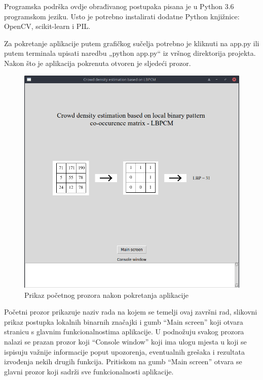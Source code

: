 \documentclass[times, utf8, zavrsni]{fer}
\begin{document}
Programska podrška ovdje obrađivanog postupaka pisana je u Python 3.6 
programskom jeziku. Usto je potrebno instalirati dodatne Python 
knjižnice: OpenCV, scikit-learn i PIL.

Za pokretanje aplikacije putem grafičkog sučelja potrebno je kliknuti 
na app.py ili putem terminala upisati naredbu „python app.py“ iz 
vršnog direktorija projekta. Nakon što je aplikacija pokrenuta 
otvoren je sljedeći prozor. 

\begin{figure}[ht]
\centering
\includegraphics[scale=0.4]{img/startpage.png}
\caption{Prikaz početnog prozora nakon pokretanja aplikacije}
\end{figure}

\newpage

Početni prozor prikazuje naziv rada na kojem se temelji ovaj završni rad, 
slikovni prikaz postupka lokalnih binarnih značajki i gumb \enquote{Main screen}
koji otvara stranicu s glavnim funkcionalnostima aplikacije. U podnožuju svakog
prozora nalazi se prazan prozor koji \enquote{Console window} koji ima ulogu
mjesta u koji se ispisuju važnije informacije poput upozorenja, eventualnih 
grešaka i rezultata izvođenja nekih drugih funkcija. Pritiskom na gumb \enquote{Main screen}
otvara se glavni prozor koji sadrži sve funkcionalnosti aplikacije.
\end{document}
